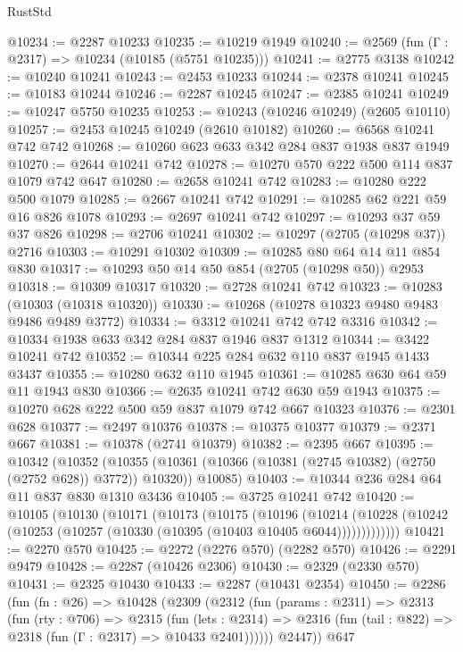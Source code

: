 \begin{lexlean}{RustStd}
\begin{coremodule}
@10234 := @2287 @10233
@10235 := @10219 @1949
@10240 := @2569 (fun (Γ : @2317) => @10234 (@10185 (@5751 @10235)))
@10241 := @2775 @3138
@10242 := @10240 @10241
@10243 := @2453 @10233
@10244 := @2378 @10241
@10245 := @10183 @10244
@10246 := @2287 @10245
@10247 := @2385 @10241
@10249 := @10247 @5750 @10235
@10253 := @10243 (@10246 @10249) (@2605 @10110)
@10257 := @2453 @10245 @10249 (@2610 @10182)
@10260 := @6568 @10241 @742 @742
@10268 := @10260 @623 @633 @342 @284 @837 @1938 @837 @1949
@10270 := @2644 @10241 @742
@10278 := @10270 @570 @222 @500 @114 @837 @1079 @742 @647
@10280 := @2658 @10241 @742
@10283 := @10280 @222 @500 @1079
@10285 := @2667 @10241 @742
@10291 := @10285 @62 @221 @59 @16 @826 @1078
@10293 := @2697 @10241 @742
@10297 := @10293 @37 @59 @37 @826
@10298 := @2706 @10241
@10302 := @10297 (@2705 (@10298 @37)) @2716
@10303 := @10291 @10302
@10309 := @10285 @80 @64 @14 @11 @854 @830
@10317 := @10293 @50 @14 @50 @854 (@2705 (@10298 @50)) @2953
@10318 := @10309 @10317
@10320 := @2728 @10241 @742
@10323 := @10283 (@10303 (@10318 @10320))
@10330 := @10268 (@10278 @10323 @9480 @9483 @9486 @9489 @3772)
@10334 := @3312 @10241 @742 @742 @3316
@10342 := @10334 @1938 @633 @342 @284 @837 @1946 @837 @1312
@10344 := @3422 @10241 @742
@10352 := @10344 @225 @284 @632 @110 @837 @1945 @1433 @3437
@10355 := @10280 @632 @110 @1945
@10361 := @10285 @630 @64 @59 @11 @1943 @830
@10366 := @2635 @10241 @742 @630 @59 @1943
@10375 := @10270 @628 @222 @500 @59 @837 @1079 @742 @667 @10323
@10376 := @2301 @628
@10377 := @2497 @10376
@10378 := @10375 @10377
@10379 := @2371 @667
@10381 := @10378 (@2741 @10379)
@10382 := @2395 @667
@10395 := @10342
    (@10352
      (@10355 (@10361 (@10366 (@10381 (@2745 @10382) (@2750 (@2752 @628)) @3772)) @10320))
      @10085)
@10403 := @10344 @236 @284 @64 @11 @837 @830 @1310 @3436
@10405 := @3725 @10241 @742
@10420 := @10105
    (@10130
      (@10171
        (@10173
          (@10175
            (@10196
              (@10214
                (@10228 (@10242 (@10253 (@10257 (@10330 (@10395 (@10403 @10405 @6044)))))))))))))
@10421 := @2270 @570
@10425 := @2272 (@2276 @570) (@2282 @570)
@10426 := @2291 @9479
@10428 := @2287 (@10426 @2306)
@10430 := @2329 (@2330 @570)
@10431 := @2325 @10430
@10433 := @2287 (@10431 @2354)
@10450 := @2286
    (fun (fn : @26) =>
    @10428
      (@2309
        (@2312
          (fun (params : @2311) =>
          @2313
            (fun (rty : @706) =>
            @2315
              (fun (lets : @2314) =>
              @2316 (fun (tail : @822) => @2318 (fun (Γ : @2317) => @10433 @2401))))))
        @2447))
    @647

\end{coremodule}
\end{lexlean}
